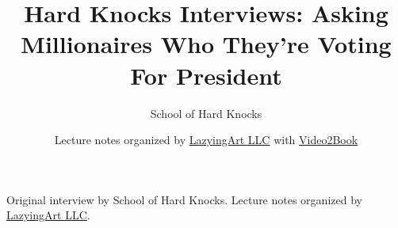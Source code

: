 \documentclass[11pt,oneside]{book}
\begin{document}
\frontmatter
\title{Hard Knocks Interviews: Asking Millionaires Who They're Voting For President}
\author{School of Hard Knocks}
\date{Lecture notes organized by \href{https://lazying.art}{LazyingArt LLC} with \href{https://github.com/lachlanchen/Video2Book}{Video2Book}}
\maketitle
\begin{center}
\small Original interview by School of Hard Knocks. Lecture notes organized by \href{https://lazying.art}{LazyingArt LLC}.
\end{center}
\clearpage
\mainmatter

\end{document}

